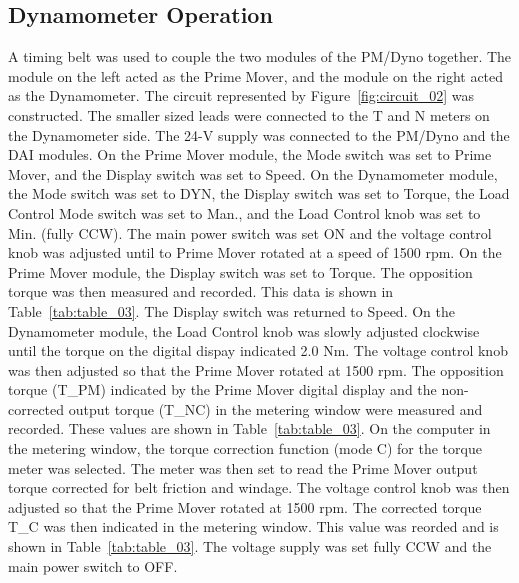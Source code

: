 \documentclass{article}
\begin{document}
\subsection{Dynamometer Operation}
\label{part2} A timing belt was used to couple the two modules of the PM/Dyno together. The module on the left 
acted as the Prime Mover, and the module on the right acted as the Dynamometer. The circuit represented by 
Figure~\ref{fig:circuit_02} was constructed. The smaller sized leads were connected to the T and N meters on the
Dynamometer side. The 24-V supply was connected to the PM/Dyno and the DAI modules. On the Prime Mover module, 
the Mode switch was set to Prime Mover, and the Display switch was set to Speed. On the Dynamometer module, the 
Mode switch was set to DYN, the Display switch was set to Torque, the Load Control Mode switch was set to Man., and 
the Load Control knob was set to Min. (fully CCW). The main power switch was set ON and the voltage control knob was
adjusted until to Prime Mover rotated at a speed of 1500 rpm. On the Prime Mover module, the Display switch was set
to Torque. The opposition torque was then measured and recorded. This data is shown in Table~\ref{tab:table_03}.
The Display switch was returned to Speed. On the Dynamometer module, the Load Control knob was slowly adjusted 
clockwise until the torque on the digital dispay indicated 2.0 Nm. The voltage control knob was then adjusted so 
that the Prime Mover rotated at 1500 rpm. The opposition torque (T_PM) indicated by the Prime Mover digital display
and the non-corrected output torque (T_NC) in the metering window were measured and recorded. These values are shown
in Table~\ref{tab:table_03}. On the computer in the metering window, the torque correction function (mode C)
for the torque meter was selected. The meter was then set to read the Prime Mover output torque corrected for
belt friction and windage. The voltage control knob was then adjusted so that the Prime Mover rotated at 1500 rpm. 
The corrected torque T_C was then indicated in the metering window. This value was reorded and is shown in 
Table~\ref{tab:table_03}. The voltage supply was set fully CCW and the main power switch to OFF. 
\end{document}
